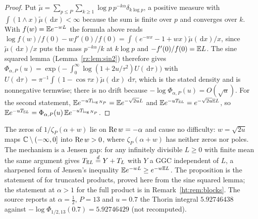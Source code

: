 \begin{proof}
Put $\tilde\mu=\sum_{p\le P}\sum_{k\ge1}\log p\,p^{-k\alpha}\delta_{k\log p}$, a positive measure with $\int(1\wedge x)\tilde\mu(\,\mathrm{d}x)<\infty$ because the sum is finite over $p$ and converges over $k$. With $f(w)=\mathbb{E} e^{-wL}$ the formula above reads $\log f(w)/f(0)-w f'(0)/f(0)=\int(e^{-wx}-1+wx)\tilde\mu(\,\mathrm{d}x)/x$, since $\tilde\mu(\,\mathrm{d}x)/x$ puts the mass $p^{-k\alpha}/k$ at $k\log p$ and $-f'(0)/f(0)=\mathbb{E} L$. The sine squared lemma (Lemma~\ref{rz:lem:sin2}) therefore gives $\Phi_{\alpha,P}(u)=\exp\big(-\int_0^\infty\log(1+2u/\tau^2)U(\,\mathrm{d}\tau)\big)$ with $U(\,\mathrm{d}\tau)=\pi^{-1}\int(1-\cos\tau x)\tilde\mu(\,\mathrm{d}x)\,\,\mathrm{d}\tau$, which is the stated density and is nonnegative termwise; there is no drift because $-\log\Phi_{\alpha,P}(u)=O(\sqrt u)$. For the second statement, $\mathbb{E} e^{-uT_{\log N_P}}=\mathbb{E} e^{-\sqrt{2u}L}$ and $\mathbb{E} e^{-uT_{\mathbb{E} L}}=e^{-\sqrt{2u}\mathbb{E} L}$, so $\mathbb{E} e^{-uT_{\mathbb{E} L}}=\Phi_{\alpha,P}(u)\,\mathbb{E} e^{-uT_{\log N_P}}$.
\end{proof}

The zeros of $1/\zeta_P(\alpha+w)$ lie on $\operatorname{Re} w=-\alpha$ and cause no difficulty: $w=\sqrt{2u}$ maps $\mathbb{C}\setminus(-\infty,0]$ into $\operatorname{Re} w>0$, where $\zeta_P(\alpha+w)$ has neither zeros nor poles. The mechanism is a Jensen gap: for any infinitely divisible $L\ge0$ with finite mean the same argument gives $T_{\mathbb{E} L}\overset d=Y+T_L$ with $Y$ a GGC independent of $L$, a sharpened form of Jensen's inequality $\mathbb{E} e^{-wL}\ge e^{-w\mathbb{E} L}$. The proposition is the statement of \cite{PolsonEuler26} for truncated products, proved here from the sine squared lemma; the statement at $\alpha>1$ for the full product is in Remark~\ref{ht:rem:blocks}. The source reports at $\alpha=\frac12$, $P=13$ and $u=0.7$ the Thorin integral $5.92746438$ against $-\log\Phi_{1/2,13}(0.7)=5.92746429$ (not recomputed).

